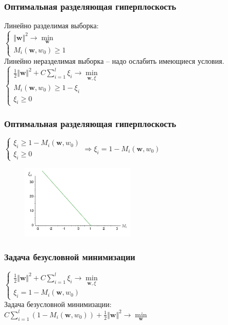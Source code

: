 \documentclass[12pt]{beamer}
\begin{document}
\begin{frame}\frametitle{Оптимальная разделяющая гиперплоскость}
Линейно разделимая выборка:\\
$\begin{cases}
{\Vert \mathbf{w} \Vert^2 \rightarrow \min\limits_{\mathbf{w}}}\\
M_i(\mathbf{w}, w_0) \geq 1
\end{cases}$\\
Линейно неразделимая выборка -- надо ослабить имеющиеся условия.\\
$\begin{cases}
{\frac{1}{2}\Vert \mathbf{w} \Vert^2 + C \sum\limits_{i=1}^l \xi_i \rightarrow \min\limits_{\mathbf{w}, \xi}}\\
M_i(\mathbf{w}, w_0) \geq 1 - \xi_i\\
\xi_i \geq 0
\end{cases}$\\
\end{frame}

\begin{frame}\frametitle{Оптимальная разделяющая гиперплоскость}
$\begin{cases}
\xi_i \geq 1 - M_i(\mathbf{w}, w_0) \\
\xi_i \geq 0
\end{cases} \Rightarrow \xi_i = 1 - M_i(\mathbf{w}, w_0) $\\
\begin{figure}[htbp]
  \includegraphics[height=100pt, keepaspectratio = true]{images/xi}   
\end{figure}
\end{frame}


\begin{frame}\frametitle{Задача безусловной минимизации}
$\begin{cases}
{\frac{1}{2}\Vert \mathbf{w} \Vert^2 + C \sum\limits_{i=1}^l \xi_i \rightarrow \min\limits_{\mathbf{w}, \xi}}\\
\xi_i = 1 - M_i(\mathbf{w}, w_0)
\end{cases}$\\
\vspace{5mm}
Задача безусловной минимизации:\\
$ C \sum\limits_{i=1}^l (1 - M_i(\mathbf{w}, w_0)) + \frac{1}{2}\Vert \mathbf{w} \Vert^2 \rightarrow \min\limits_{\mathbf{w}}$
\end{frame}
\end{document}
